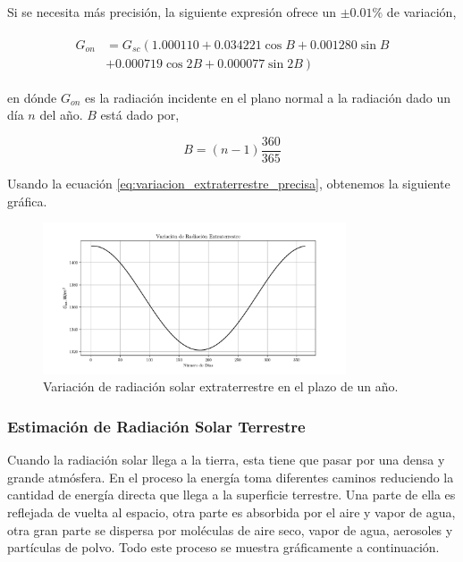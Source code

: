 Si se necesita más precisión, la siguiente expresión ofrece un $\pm0.01\%$ de variación,

\begin{align}
	\begin{aligned} \label{eq:variacion_extraterrestre_precisa}
		G_{on} & = G_{sc} \left(1.000110 + 0.034221 \cos B + 0.001280 \sin B \right.	\\
		& \left. + 0.000719 \cos 2B + 0.000077 \sin 2B \right)
	\end{aligned}
\end{align}

en dónde $G_{on}$ es la radiación incidente en el plano normal a la radiación dado un día $n$ del año. $B$ está dado por,

\begin{equation}
	B = \left(n - 1\right) \frac{360}{365}
\end{equation}

Usando la ecuación \ref{eq:variacion_extraterrestre_precisa}, obtenemos la siguiente gráfica.

\begin{figure}[htbp]
	\centering
	\includegraphics[width=0.8\textwidth, angle=0]{images/variationextraterrestrialsolarradiation.pdf}
	\caption{Variación de radiación solar extraterrestre en el plazo de un año.}
\end{figure}

\subsubsection{Estimación de Radiación Solar Terrestre}
Cuando la radiación solar llega a la tierra, esta tiene que pasar por una densa y grande atmósfera. En el proceso la energía toma diferentes caminos reduciendo la cantidad de energía directa que llega a la superficie terrestre. Una parte de ella es reflejada de vuelta al espacio, otra parte es absorbida por el aire y vapor de agua, otra gran parte se dispersa por moléculas de aire seco, vapor de agua, aerosoles y partículas de polvo. Todo este proceso se muestra gráficamente a continuación.

